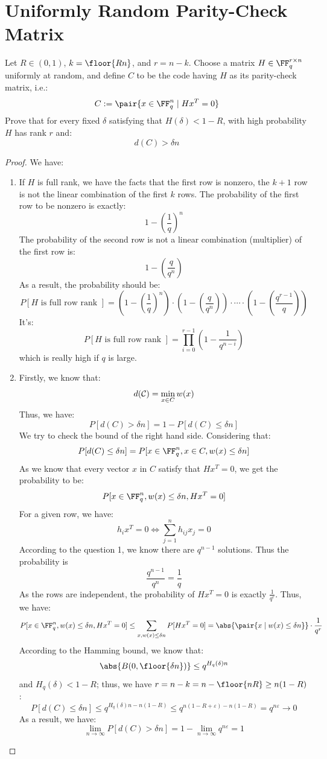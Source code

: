 \section{Uniformly Random Parity-Check Matrix}
Let \( R \in ( 0, 1 ) \), \( k = \floor{ R n } \), and \( r = n - k \). Choose a matrix \( H \in \FF_q^{ r \times n } \) uniformly at random, and define \( C \) to be the code having \( H \) as its parity-check matrix, i.e.:
\[
    C := \pair{
        x \in \FF_q^n 
        \mid 
        H x^T = 0
    }
\]
Prove that for every fixed \( \delta \) satisfying that \( H( \delta ) < 1 - R \), with high probability \( H \) has rank \( r \) and:
\[
    d( C ) > \delta n
\]
\begin{proof}
We have:

\begin{enumerate}
\item If \( H \) is full rank, we have the facts that the first row is nonzero, the \( k + 1 \) row is not the linear combination of the first \( k \) rows. The probability of the first row to be nonzero is exactly:
\[
    1 - \left( \frac{1}{q} \right)^n
\]
The probability of the second row is not a linear combination (multiplier) of the first row is:
\[
    1 - ( \frac{q}{ q^n } )
\]
As a result, the probability should be:
\[
    P[ H \text{ is full row rank } ]
    = \left( 1 - \left( \frac{1}{q} \right)^n \right) 
    \cdot \left( 1 - \left( \frac{q}{q^n} \right) \right) 
    \cdot \cdots 
    \cdot (1 - \left( \frac{ q^{ r - 1 } }{q} \right))
\]
It's:
\[
    P[ H \text{ is full row rank } ] 
    = \prod_{ i = 0 }^{r  - 1} ( 1 - \frac{ 1 }{ q^{ n - i } } )
\]
which is really high if \( q \) is large.

\item Firstly, we know that:
\[
    d({\cal C}) = \min_{ x \in C } w(x)
\]
Thus, we have:
\[
    P[ d(C) > \delta n ] = 1 - P[ d(C) \le \delta n ] 
\]
We try to check the bound of the right hand side. Considering that:
\[
    P[ d(C) \le \delta n ] 
    = P[ x \in \FF_q^n, x \in C, w(x) \le \delta n ]
\]
As we know that every vector \( x \) in \( C \) satisfy that \( H x^T = 0 \), we get the probability to be:
\[
    P[ x \in \FF_q^n, w(x) \le \delta n, H x^T = 0 ]
\]
For a given row, we have:
\[
    h_i x^T = 0 \iff \sum_{ j = 1 }^n h_{ij} x_j = 0
\]
According to the question 1, we know there are \( q^{ n - 1 } \) solutions. Thus the probability is
\[
    \frac{ q^{ n - 1 } }{ q^{n} } = \frac{ 1 }{ q }
\]
As the rows are independent, the probability of \( H x^T = 0 \) is exactly \( \frac{1}{q^r} \). Thus, we have:
\[
    P[ x \in \FF_q^n, w(x) \le \delta n, H x^T = 0 ] 
    \le \sum_{ x, w(x) \le \delta n } P[ H x^T = 0 ] = 
    \abs{\pair{ x \mid w(x) \le \delta n }} 
    \cdot \frac{1}{q^r}
\]
According to the Hamming bound, we know that:
\[
    \abs{ B( 0, \floor{ \delta n } ) } 
    \le q^{ H_q( \delta ) n }
\]
and \( H_q(\delta) < 1 - R \); thus, we have \( r = n - k = n - \floor{ nR } \ge n( 1 - R ) \):
\[
    P[ d(C) \le \delta n ] \le 
    q^{ H_q(\delta)n - n( 1 - R )  }
    \le q^{ n(1 - R + \varepsilon) - n(1 - R) }
    = q^{ n\varepsilon } \to 0
\]
As a result, we have:
\[
    \lim_{ n \to \infty} 
    P[ d(C) > \delta n ] 
    = 1 - \lim_{ n \to \infty } q^{ n\varepsilon } 
    = 1
\]


\end{enumerate}
\end{proof}
